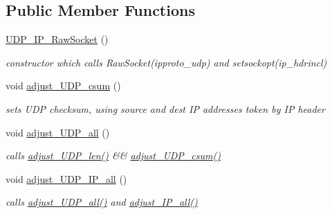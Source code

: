 \subsection*{Public Member Functions}
\begin{CompactItemize}
\item 
\hypertarget{classsocketpp_1_1UDP__IP__RawSocket_90e90d941b64d234c231ca543fe8745a}{
\hyperlink{classsocketpp_1_1UDP__IP__RawSocket_90e90d941b64d234c231ca543fe8745a}{UDP\_\-IP\_\-RawSocket} ()}
\label{classsocketpp_1_1UDP__IP__RawSocket_90e90d941b64d234c231ca543fe8745a}

\begin{CompactList}\small\item\em constructor which calls RawSocket(ipproto\_\-udp) and setsockopt(ip\_\-hdrincl) \item\end{CompactList}\item 
\hypertarget{classsocketpp_1_1UDP__IP__RawSocket_6c2f6c375cec90f64fd093af37369d6a}{
void \hyperlink{classsocketpp_1_1UDP__IP__RawSocket_6c2f6c375cec90f64fd093af37369d6a}{adjust\_\-UDP\_\-csum} ()}
\label{classsocketpp_1_1UDP__IP__RawSocket_6c2f6c375cec90f64fd093af37369d6a}

\begin{CompactList}\small\item\em sets UDP checksum, using source and dest IP addresses token by IP header \item\end{CompactList}\item 
\hypertarget{classsocketpp_1_1UDP__IP__RawSocket_94bec31d8c856ccdafa083c74b8b7e58}{
void \hyperlink{classsocketpp_1_1UDP__IP__RawSocket_94bec31d8c856ccdafa083c74b8b7e58}{adjust\_\-UDP\_\-all} ()}
\label{classsocketpp_1_1UDP__IP__RawSocket_94bec31d8c856ccdafa083c74b8b7e58}

\begin{CompactList}\small\item\em calls \hyperlink{classsocketpp_1_1UDP__RawSocket_1caa413cfe4f72d8c0aeccdcb10469b5}{adjust\_\-UDP\_\-len()} \&\& \hyperlink{classsocketpp_1_1UDP__IP__RawSocket_6c2f6c375cec90f64fd093af37369d6a}{adjust\_\-UDP\_\-csum()} \item\end{CompactList}\item 
\hypertarget{classsocketpp_1_1UDP__IP__RawSocket_1a0f6360760f94f5c1569adde67d6d1b}{
void \hyperlink{classsocketpp_1_1UDP__IP__RawSocket_1a0f6360760f94f5c1569adde67d6d1b}{adjust\_\-UDP\_\-IP\_\-all} ()}
\label{classsocketpp_1_1UDP__IP__RawSocket_1a0f6360760f94f5c1569adde67d6d1b}

\begin{CompactList}\small\item\em calls \hyperlink{classsocketpp_1_1UDP__IP__RawSocket_94bec31d8c856ccdafa083c74b8b7e58}{adjust\_\-UDP\_\-all()} and \hyperlink{classsocketpp_1_1IP__RawSocket_45e60510233daaa2f279d3a4706fdce5}{adjust\_\-IP\_\-all()} \item\end{CompactList}\end{CompactItemize}
